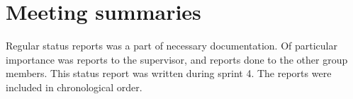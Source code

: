 \section{Meeting summaries}
Regular status reports was a part of necessary documentation. Of particular importance was reports to the supervisor, and reports done to the other group members. This status report was written during sprint 4. The reports were included in chronological order.










